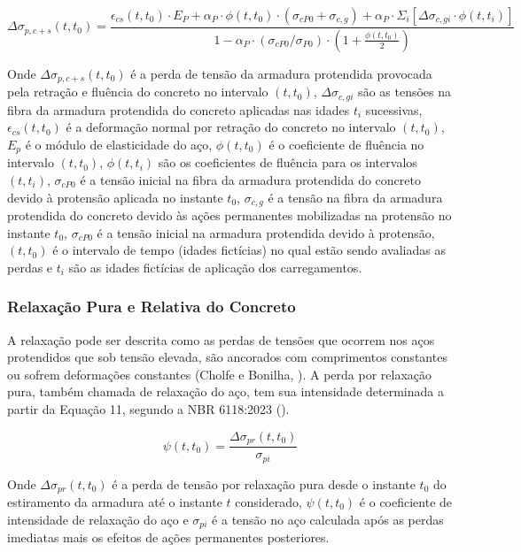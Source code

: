 \begin{equation}
\Delta\sigma_{p,c+s}(t,t_0) = \frac{\epsilon_{cs}(t,t_0) \cdot E_P + \alpha_P \cdot \phi(t,t_0) \cdot (\sigma_{cP0} + \sigma_{c,g}) + \alpha_P \cdot \Sigma_i[\Delta \sigma_{c,gi} \cdot \phi(t,t_i)]}{1 - \alpha_P \cdot (\sigma_{cP0} / \sigma_{P0}) \cdot (1 + \frac{\phi(t,t_0)}{2})}
\end{equation}\bigskip

Onde $\Delta\sigma_{p,c+s}(t,t_0)$ é a perda de tensão da armadura protendida provocada pela retração e fluência do concreto no intervalo $(t,t_0)$, $\Delta\sigma_{c,gi}$ são as tensões na fibra da armadura protendida do concreto aplicadas nas idades $t_i$ sucessivas, $\epsilon_{cs}(t,t_0)$ é a deformação normal por retração do concreto no intervalo $(t,t_0)$, $E_p$ é o módulo de elasticidade do aço, $\phi(t,t_0)$ é o coeficiente de fluência no intervalo $(t,t_0)$, $\phi(t,t_i)$ são os coeficientes de fluência para os intervalos $(t,t_i)$, $\sigma_{cP0}$ é a tensão inicial na fibra da armadura protendida do concreto devido à protensão aplicada no instante $t_0$, $\sigma_{c,g}$ é a tensão na fibra da armadura protendida do concreto devido às ações permanentes mobilizadas na protensão no instante $t_0$, $\sigma_{cP0}$ é a tensão inicial na armadura protendida devido à protensão, $(t,t_0)$ é o intervalo de tempo (idades fictícias) no qual estão sendo avaliadas as perdas e $t_i$ são as idades fictícias de aplicação dos carregamentos.

\subsubsection{Relaxação Pura e Relativa do Concreto}

\hspace{0.4cm}A relaxação pode ser descrita como as perdas de tensões que ocorrem nos aços protendidos que sob tensão elevada, são ancorados com comprimentos constantes ou sofrem deformações constantes (Cholfe e Bonilha, \citeyear{CB}). A perda por relaxação pura, também chamada de relaxação do aço, tem sua intensidade determinada a partir da Equação 11, segundo a NBR 6118:2023 (\citeyear{NOAB}).\bigskip

\begin{equation}
\psi(t,t_0) = \frac{\Delta\sigma_{pr}(t,t_0)}{\sigma_{pi}}
\end{equation}\bigskip

Onde $\Delta\sigma_{pr}(t,t_0)$ é a perda de tensão por relaxação pura desde o instante $t_0$ do estiramento da armadura até o instante $t$ considerado, $\psi(t,t_0)$ é o coeficiente de intensidade de relaxação do aço e $\sigma_{pi}$ é a tensão no aço calculada após as perdas imediatas mais os efeitos de ações permanentes posteriores. 

